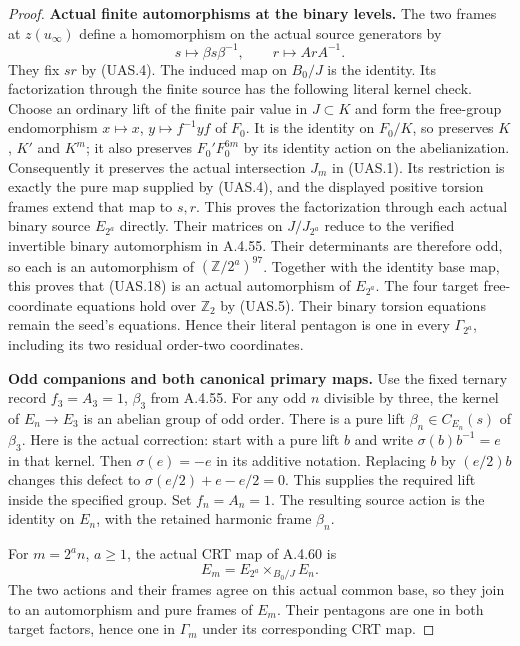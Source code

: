 \begin{proof}
\par\medskip\noindent\textbf{Actual finite automorphisms at the binary levels.}\quad
The two frames at $z(u_\infty)$ define a homomorphism on the
actual source generators by
\[
       s\longmapsto\beta s\beta^{-1},\qquad
       r\longmapsto ArA^{-1}.                                   \tag{UAS.18}
\]
They fix $sr$ by (UAS.4).  The induced map on $B_0/J$ is the
identity.  Its factorization through the finite source has the
following literal kernel check.  Choose an ordinary lift of the
finite pair value in $J\subset K$ and form the free-group
endomorphism $x\mapsto x$, $y\mapsto f^{-1}yf$ of $F_0$.
It is the identity on $F_0/K$, so preserves $K$, $K'$ and $K^m$;
it also preserves $F_0'F_0^{6m}$ by its identity action on the
abelianization.  Consequently it preserves the actual intersection
$J_m$ in (UAS.1).  Its restriction is exactly the pure map supplied
by (UAS.4), and the displayed positive torsion frames extend that
map to $s,r$.  This proves the factorization through each actual
binary source $E_{2^a}$ directly.
Their matrices on $J/J_{2^a}$ reduce to the verified invertible
binary automorphism in A.4.55.  Their determinants are therefore
odd, so each is an automorphism of $(\mathbb Z/2^a)^{97}$.
Together with the identity base map, this proves that (UAS.18)
is an actual automorphism of $E_{2^a}$.
The four target free-coordinate equations hold over $\mathbb Z_2$
by (UAS.5).  Their binary torsion equations remain the seed's
equations.  Hence their literal pentagon is one in every
$\Gamma_{2^a}$, including its two residual order-two coordinates.

\par\medskip\noindent\textbf{Odd companions and both canonical primary maps.}\quad
Use the fixed ternary record $f_3=A_3=1$, $\beta_3$ from A.4.55.
For any odd $n$ divisible by three, the kernel of $E_n\to E_3$
is an abelian group of odd order.  There is a pure lift
$\beta_n\in C_{E_n}(s)$ of $\beta_3$.
Here is the actual correction: start with a pure lift $b$ and
write $\sigma(b)b^{-1}=e$ in that kernel.  Then
$\sigma(e)=-e$ in its additive notation.  Replacing $b$ by
$(e/2)b$ changes this defect to
$\sigma(e/2)+e-e/2=0$.
This supplies the required lift inside the specified group.
Set $f_n=A_n=1$.  The resulting source action is the identity
on $E_n$, with the retained harmonic frame $\beta_n$.

For $m=2^a n$, $a\geq1$, the actual CRT map of A.4.60 is
\[
       E_m=E_{2^a}\mathop{\times}_{B_0/J}E_n.                    \tag{UAS.19}
\]
The two actions and their frames agree on this actual common base,
so they join to an automorphism and pure frames of $E_m$.
Their pentagons are one in both target factors, hence one in
$\Gamma_m$ under its corresponding CRT map.


\end{proof}
